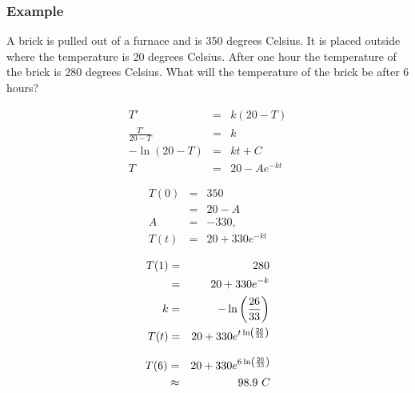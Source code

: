 \begin{frame}
  \frametitle{Example}

  A brick is pulled out of a furnace and is 350 degrees Celsius. It is
  placed outside where the temperature is 20 degrees Celsius. After
  one hour the temperature of the brick is 280 degrees Celsius. What
  will the temperature of the brick be after 6 hours?


\end{frame}


\begin{frame}

  \begin{eqnarray*}
    T' & = & k (20-T) \\
    \frac{T'}{20-T} & = & k \\
    -\ln(20-T) & = & kt + C \\
    T & = & 20 - A e^{-kt}
  \end{eqnarray*}

  \begin{eqnarray*}
    T(0) & = & 350 \\
    & = & 20 - A \\
    A & = & -330, \\
    T(t) & = & 20 + 330 e^{-kt}
  \end{eqnarray*}

\end{frame}


\begin{frame}

  \begin{eqnarray*}
    T(1) & = & 280 \\
    & = & 20 + 330 e^{-k} \\
    k & = & -\ln\left(\frac{26}{33}\right) \\
    T(t) & = & 20 + 330 e^{t\ln\left(\frac{26}{33}\right)}
  \end{eqnarray*}

  \begin{eqnarray*}
    T(6) & = & 20 + 330 e^{6\ln\left(\frac{26}{33}\right)} \\
    & \approx & 98.9 ~C
  \end{eqnarray*}

\end{frame}


